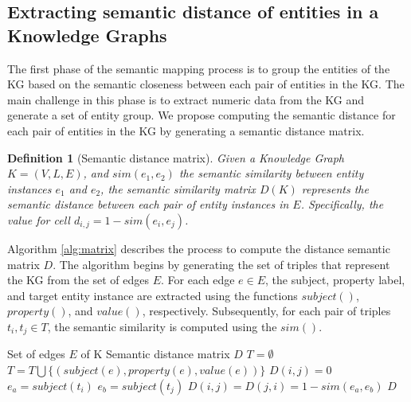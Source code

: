 \documentclass{ieeeaccess}
\newtheorem{Definition}{Definition}
\begin{document}
\subsection{Extracting semantic distance of entities in a
Knowledge Graphs}

The first phase of the semantic mapping process is to
group the entities of the KG based on the semantic 
closeness between each pair of entities in the KG. 
The main challenge in this phase is to extract 
numeric data from the KG and generate a set of
entity group. We propose computing the semantic
distance for each pair of entities in the KG by
generating a semantic distance matrix.

\begin{Definition}[Semantic distance matrix]
Given a Knowledge Graph $K = (V, L, E)$, and 
$sim(e_{1}, e_{2})$ the semantic similarity between
entity instances $e_{1}$ and $e_{2}$, the semantic 
similarity matrix $D(K)$ represents the semantic 
distance between each pair of entity instances in $E$.
Specifically, the value for cell $d_{i,j} = 1 - 
sim(e_{i}, e_{j})$.
\end{Definition}

Algorithm \ref{alg:matrix} describes the process to 
compute the distance semantic matrix $D$. The algorithm 
begins by generating the set of triples that represent 
the KG from the set of edges $E$. For each edge $e \in E$,
the subject, property label, and target
entity instance are extracted using the functions 
$subject()$, $property()$, and $value()$, respectively. 
Subsequently, for each pair of triples $t_{i}, t_{j} \in T$,
the semantic similarity is computed using the $sim()$. 

\begin{algorithm}
 \caption{Algorithm to build the semantic distance matrix}
 \label{alg:matrix}
 \begin{algorithmic}[1]
 \renewcommand{\algorithmicrequire}{\textbf{Input:}}
 \renewcommand{\algorithmicensure}{\textbf{Output:}}
 \REQUIRE Set of edges $E$ of K
 \ENSURE  Semantic distance matrix $D$
  \STATE $T = \emptyset$
    \STATE $T = T \bigcup \{(subject(e), property(e), value(e))\}$ 
  \ENDFOR
        \STATE $D(i, j) = 0$
    \ELSE
        \STATE $e_{a} = subject(t_{i})$
        \STATE $e_{b} = subject(t_{j})$
        \STATE $D(i,j) = D(j, i) = 1 - sim(e_{a}, e_{b})$
    \ENDIF
  \ENDFOR
 \RETURN $D$ 
 \end{algorithmic} 
 \end{algorithm}
 
\end{document}
